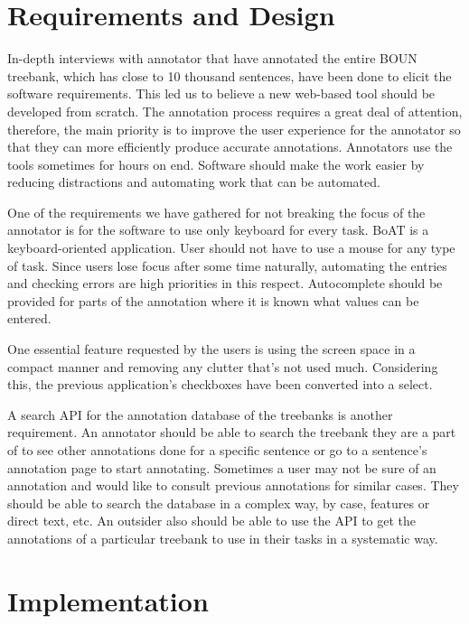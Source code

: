 \documentclass[
]{ceurart}
\begin{document}
\section{Requirements and Design}
\label{sec:requirements}

In-depth interviews with annotator that have annotated the entire BOUN treebank, which has close to 10 thousand sentences, have been done to elicit the software requirements.
This led us to believe a new web-based tool should be developed from scratch.
The annotation process requires a great deal of attention, therefore, the main priority is to improve the user experience for the annotator so that they can more efficiently produce accurate annotations.
Annotators use the tools sometimes for hours on end.
Software should make the work easier by reducing distractions and automating work that can be automated.

One of the requirements we have gathered for not breaking the focus of the annotator is for the software to use only keyboard for every task.
BoAT is a keyboard-oriented application.
User should not have to use a mouse for any type of task.
Since users lose focus after some time naturally, automating the entries and checking errors are high priorities in this respect.
Autocomplete should be provided for parts of the annotation where it is known what values can be entered.

One essential feature requested by the users is using the screen space in a compact manner and removing any clutter that's not used much.
Considering this, the previous application's checkboxes have been converted into a select.

A search API for the annotation database of the treebanks is another requirement.
An annotator should be able to search the treebank they are a part of to see other annotations done for a specific sentence or go to a sentence's annotation page to start annotating.
Sometimes a user may not be sure of an annotation and would like to consult previous annotations for similar cases.
They should be able to search the database in a complex way, by case, features or direct text, etc.
An outsider also should be able to use the API to get the annotations of a particular treebank to use in their tasks in a systematic way.

\section{Implementation}
\end{document}
